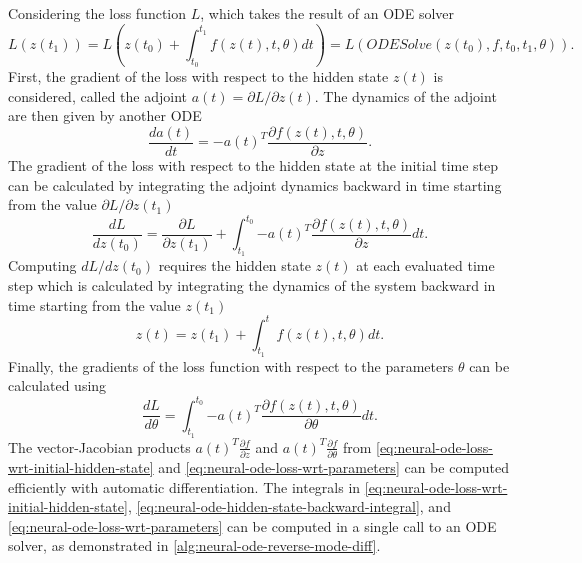 Considering the loss function $L$, which takes the result of an \gls{ODE} solver \cite{chenNeuralOrdinaryDifferential2019}
\begin{equation*}
    L(z(t_1)) = L\left(z(t_0) + \int_{t_0}^{t_1}{f(z(t), t, \theta)dt}\right) = L(ODESolve(z(t_0), f, t_0, t_1, \theta)).
\end{equation*}
First, the gradient of the loss with respect to the hidden state $z(t)$ is considered, called the adjoint $a(t) = \partial L / \partial z(t)$.
The dynamics of the adjoint are then given by another \gls{ODE} \cite{chenNeuralOrdinaryDifferential2019}
\begin{equation*}
    \frac{da(t)}{dt} = -a(t)^T\frac{\partial f(z(t), t, \theta)}{\partial z}.
\end{equation*}
The gradient of the loss with respect to the hidden state at the initial time step can be calculated by integrating the adjoint dynamics backward in time starting from the value $\partial L / \partial z(t_1)$ \cite{chenNeuralOrdinaryDifferential2019}
\begin{equation}
    \frac{dL}{dz(t_0)} = \frac{\partial L}{\partial z(t_1)} + \int_{t_1}^{t_0}{-a(t)^T\frac{\partial f(z(t), t, \theta)}{\partial z}} dt.
    \label{eq:neural-ode-loss-wrt-initial-hidden-state}
\end{equation}
Computing $dL/dz(t_0)$ requires the hidden state $z(t)$ at each evaluated time step which is calculated by integrating the dynamics of the system backward in time starting from the value $z(t_1)$ \cite{chenNeuralOrdinaryDifferential2019}
\begin{equation}
    z(t) = z(t_1) + \int_{t_1}^{t}{f(z(t), t, \theta)dt}.
    \label{eq:neural-ode-hidden-state-backward-integral}
\end{equation}
Finally, the gradients of the loss function with respect to the parameters $\theta$ can be calculated using \cite{chenNeuralOrdinaryDifferential2019}
\begin{equation}
    \frac{dL}{d\theta} = \int_{t_1}^{t_0}{-a(t)^T\frac{\partial f(z(t), t, \theta)}{\partial \theta}} dt.
    \label{eq:neural-ode-loss-wrt-parameters}
\end{equation}
The vector-Jacobian products $a(t)^T\frac{\partial f}{\partial z}$ and $a(t)^T\frac{\partial f}{\partial \theta}$ from \autoref{eq:neural-ode-loss-wrt-initial-hidden-state} and \autoref{eq:neural-ode-loss-wrt-parameters} can be computed efficiently with automatic differentiation.
The integrals in \autoref{eq:neural-ode-loss-wrt-initial-hidden-state}, \autoref{eq:neural-ode-hidden-state-backward-integral}, and \autoref{eq:neural-ode-loss-wrt-parameters} can be computed in a single call to an \gls{ODE} solver, as demonstrated in \autoref{alg:neural-ode-reverse-mode-diff}.